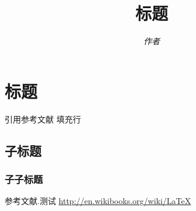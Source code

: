 \documentclass[a4paper,11pt]{article}
\title{\bf 标题}
\author{\it 作者}
\date{}
\begin{document}
\maketitle

\newcommand{\itembf}[1]{\item{\bf #1}}

\section{标题}
引用参考文献\cite{bib:test} \hfill 填充行
\subsection{子标题}
\subsubsection{子子标题}

\renewcommand\refname{参考文献}

\begin{thebibliography}{99}
     参考文献.测试
     \url{http://en.wikibooks.org/wiki/LaTeX}
\end{thebibliography}
\end{document}
